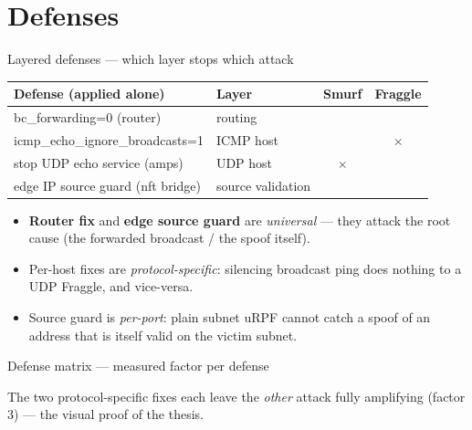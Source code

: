 \documentclass[aspectratio=169,10pt]{beamer}
\newcommand{\yes}{\textcolor{vicc}{\checkmark}}
\newcommand{\no}{\textcolor{attc}{\textbf{$\times$}}}
\newcommand{\code}[1]{{\ttfamily #1}}
\begin{document}
\section{Defenses}
\begin{frame}{Layered defenses — which layer stops which attack}
  \centering
  \small
  \begin{tabular}{@{}p{4.7cm}p{3.2cm}cc@{}}
    \toprule
    \textbf{Defense (applied alone)} & \textbf{Layer} & \textbf{Smurf} & \textbf{Fraggle}\\
    \midrule
    \code{bc\_forwarding=0} (router) & routing & \yes & \yes\\
    \code{icmp\_echo\_ignore\_broadcasts=1} & ICMP host & \yes & \no\\
    stop UDP echo service (amps) & UDP host & \no & \yes\\
    edge IP source guard (nft bridge) & source validation & \yes & \yes\\
    \bottomrule
  \end{tabular}

  \vspace{5pt}
  \begin{itemize}\footnotesize
    \item \textbf{Router fix} and \textbf{edge source guard} are \emph{universal} — they
          attack the root cause (the forwarded broadcast / the spoof itself).
    \item Per-host fixes are \emph{protocol-specific}: silencing broadcast ping does
          nothing to a UDP Fraggle, and vice-versa.
    \item Source guard is \emph{per-port}: plain subnet uRPF cannot catch a spoof of an
          address that is itself valid on the victim subnet.
  \end{itemize}
\end{frame}

\begin{frame}{Defense matrix — measured factor per defense}
  \centering

  \footnotesize The two protocol-specific fixes each leave the \emph{other} attack fully
  amplifying (factor 3) — the visual proof of the thesis.
\end{frame}
\end{document}
